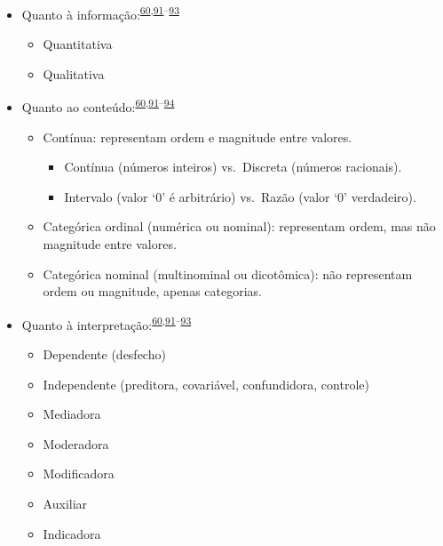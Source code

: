 \documentclass[
  a4paper,
]{book}
\begin{document}
\begin{itemize}
\item
  Quanto à informação:\textsuperscript{\protect\hyperlink{ref-vetter2017}{60},\protect\hyperlink{ref-Ali2016}{91}--\protect\hyperlink{ref-kaliyadan2019}{93}}

  \begin{itemize}
  \item
    Quantitativa
  \item
    Qualitativa
  \end{itemize}
\item
  Quanto ao conteúdo:\textsuperscript{\protect\hyperlink{ref-vetter2017}{60},\protect\hyperlink{ref-Ali2016}{91}--\protect\hyperlink{ref-barkan2015}{94}}

  \begin{itemize}
  \item
    Contínua: representam ordem e magnitude entre valores.

    \begin{itemize}
    \item
      Contínua (números inteiros) vs.~Discreta (números racionais).
    \item
      Intervalo (valor `0' é arbitrário) vs.~Razão (valor `0' verdadeiro).
    \end{itemize}
  \item
    Categórica ordinal (numérica ou nominal): representam ordem, mas não magnitude entre valores.
  \item
    Categórica nominal (multinominal ou dicotômica): não representam ordem ou magnitude, apenas categorias.
  \end{itemize}
\item
  Quanto à interpretação:\textsuperscript{\protect\hyperlink{ref-vetter2017}{60},\protect\hyperlink{ref-Ali2016}{91}--\protect\hyperlink{ref-kaliyadan2019}{93}}

  \begin{itemize}
  \item
    Dependente (desfecho)
  \item
    Independente (preditora, covariável, confundidora, controle)
  \item
    Mediadora
  \item
    Moderadora
  \item
    Modificadora
  \item
    Auxiliar
  \item
    Indicadora
  \end{itemize}
\end{itemize}
\end{document}
